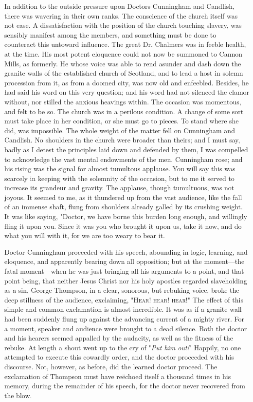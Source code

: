 In addition to the outside pressure upon Doctors Cunningham and
Candlish, there was wavering in their own ranks. The conscience of the
church itself was not ease. A dissatisfaction with the position of the
church touching slavery, was sensibly manifest among the members, and
something must be done to counteract this untoward influence. The great
Dr. Chalmers was in feeble health, at the time. His most potent
eloquence could not now be summoned to Cannon Mills, as formerly. He
whose voice was able to rend asunder and dash down the granite walls of
the established church of Scotland, and to lead a host in solemn
procession from it, as from a doomed city, was now old and enfeebled.
Besides, he had said his word on this very question; and his word had
not silenced the clamor without, nor stilled the anxious heavings
within. The occasion was momentous, and felt to be so. The church was in
a perilous condition. A change of some sort must take place in her
condition, or she must go to pieces. To stand where she did, was
impossible. The whole weight of the matter fell on Cunningham and
Candlish. No shoulders in the church were broader than theirs; and I
must say, badly as I detest the principles laid down and defended by
them, I was compelled to acknowledge the vast mental endowments of the
men. {\protect\hypertarget{385}{}{}}Cunningham rose; and his rising was
the signal for almost tumultous applause. You will say this was scarcely
in keeping with the solemnity of the occasion, but to me it served to
increase its grandeur and gravity. The applause, though tumultuous, was
not joyous. It seemed to me, as it thundered up from the vast audience,
like the fall of an immense shaft, flung from shoulders already galled
by its crushing weight. It was like saying, "Doctor, we have borne this
burden long enough, and willingly fling it upon you. Since it was you
who brought it upon us, take it now, and do what you will with it, for
we are too weary to bear it.

Doctor Cunningham proceeded with his speech, abounding in logic,
learning, and eloquence, and apparently bearing down all opposition; but
at the moment---the fatal moment---when he was just bringing all his
arguments to a point, and that point being, that neither Jesus Christ
nor his holy apostles regarded slaveholding as a sin, George Thompson,
in a clear, sonorous, but rebuking voice, broke the deep stillness of
the audience, exclaiming, "\textsc{Hear! hear! hear}!" The effect of
this simple and common exclamation is almost incredible. It was as if a
granite wall had been suddenly flung up against the advancing current of
a mighty river. For a moment, speaker and audience were brought to a
dead silence. Both the doctor and his hearers seemed appalled by the
audacity, as well as the fitness of the rebuke. At length a shout went
up to the cry of "\emph{Put him out!}" Happily, no one attempted to
execute this cowardly order, and the doctor proceeded with his
discourse. {\protect\hypertarget{386}{}{}}Not, however, as before, did
the learned doctor proceed. The exclamation of Thompson must have
reëchoed itself a thousand times in his memory, during the remainder of
his speech, for the doctor never recovered from the blow.

